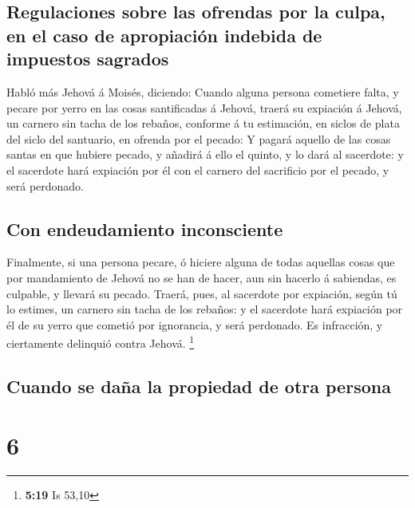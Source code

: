 \hypertarget{regulaciones-sobre-las-ofrendas-por-la-culpa-en-el-caso-de-apropiaciuxf3n-indebida-de-impuestos-sagrados}{%
\subsection{Regulaciones sobre las ofrendas por la culpa, en el caso de
apropiación indebida de impuestos
sagrados}\label{regulaciones-sobre-las-ofrendas-por-la-culpa-en-el-caso-de-apropiaciuxf3n-indebida-de-impuestos-sagrados}}

 Habló más Jehová á Moisés, diciendo:  Cuando
alguna persona cometiere falta, y pecare por yerro en las cosas
santificadas á Jehová, traerá su expiación á Jehová, un carnero sin
tacha de los rebaños, conforme á tu estimación, en siclos de plata del
siclo del santuario, en ofrenda por el pecado:  Y pagará
aquello de las cosas santas en que hubiere pecado, y añadirá á ello el
quinto, y lo dará al sacerdote: y el sacerdote hará expiación por él con
el carnero del sacrificio por el pecado, y será perdonado.

\hypertarget{con-endeudamiento-inconsciente}{%
\subsection{Con endeudamiento
inconsciente}\label{con-endeudamiento-inconsciente}}

 Finalmente, si una persona pecare, ó hiciere alguna de
todas aquellas cosas que por mandamiento de Jehová no se han de hacer,
aun sin hacerlo á sabiendas, es culpable, y llevará su pecado.
 Traerá, pues, al sacerdote por expiación, según tú lo
estimes, un carnero sin tacha de los rebaños: y el sacerdote hará
expiación por él de su yerro que cometió por ignorancia, y será
perdonado.  Es infracción, y ciertamente delinquió contra
Jehová. \footnote{\textbf{5:19} Is 53,10}

\hypertarget{cuando-se-dauxf1a-la-propiedad-de-otra-persona}{%
\subsection{Cuando se daña la propiedad de otra
persona}\label{cuando-se-dauxf1a-la-propiedad-de-otra-persona}}

\hypertarget{section-5}{%
\section{6}\label{section-5}}

